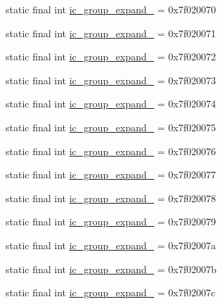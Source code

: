 \begin{CompactItemize}
\item 
static final int \hyperlink{classandroid_1_1support_1_1v7_1_1appcompat_1_1_r_1_1drawable_ea7db7f571e0350e18905b8dccddca91}{ic\_\-group\_\-expand\_} = 0x7f020070
\item 
static final int \hyperlink{classandroid_1_1support_1_1v7_1_1appcompat_1_1_r_1_1drawable_6afed6e1cb13cf4baf0a7bfca1a0a2c9}{ic\_\-group\_\-expand\_} = 0x7f020071
\item 
static final int \hyperlink{classandroid_1_1support_1_1v7_1_1appcompat_1_1_r_1_1drawable_58f639c29b0b72a6972b7603759f9eed}{ic\_\-group\_\-expand\_} = 0x7f020072
\item 
static final int \hyperlink{classandroid_1_1support_1_1v7_1_1appcompat_1_1_r_1_1drawable_44bc4baf39ebc416a350a6019e0890e3}{ic\_\-group\_\-expand\_} = 0x7f020073
\item 
static final int \hyperlink{classandroid_1_1support_1_1v7_1_1appcompat_1_1_r_1_1drawable_08a4c2b5c90b9ad5b834727010a09fce}{ic\_\-group\_\-expand\_} = 0x7f020074
\item 
static final int \hyperlink{classandroid_1_1support_1_1v7_1_1appcompat_1_1_r_1_1drawable_6f2fd96793b46f3b5abb65f68c5d2e01}{ic\_\-group\_\-expand\_} = 0x7f020075
\item 
static final int \hyperlink{classandroid_1_1support_1_1v7_1_1appcompat_1_1_r_1_1drawable_b7606a7a2c88126d49b4e0afb0775f7b}{ic\_\-group\_\-expand\_} = 0x7f020076
\item 
static final int \hyperlink{classandroid_1_1support_1_1v7_1_1appcompat_1_1_r_1_1drawable_285f3e048bd2ae23fcaacde9b7223e37}{ic\_\-group\_\-expand\_} = 0x7f020077
\item 
static final int \hyperlink{classandroid_1_1support_1_1v7_1_1appcompat_1_1_r_1_1drawable_5d3864883e9016e783928d4db4170aa0}{ic\_\-group\_\-expand\_} = 0x7f020078
\item 
static final int \hyperlink{classandroid_1_1support_1_1v7_1_1appcompat_1_1_r_1_1drawable_8e19dd21c520a46cbab493d71536bb3b}{ic\_\-group\_\-expand\_} = 0x7f020079
\item 
static final int \hyperlink{classandroid_1_1support_1_1v7_1_1appcompat_1_1_r_1_1drawable_cfa0fb56e3058ec161919f4aeefed8b4}{ic\_\-group\_\-expand\_} = 0x7f02007a
\item 
static final int \hyperlink{classandroid_1_1support_1_1v7_1_1appcompat_1_1_r_1_1drawable_845fb977ae086681d17e5760c200190a}{ic\_\-group\_\-expand\_} = 0x7f02007b
\item 
static final int \hyperlink{classandroid_1_1support_1_1v7_1_1appcompat_1_1_r_1_1drawable_5d4fcf4dee8c52399482f97f16c578dc}{ic\_\-group\_\-expand\_} = 0x7f02007c

\end{CompactItemize}
